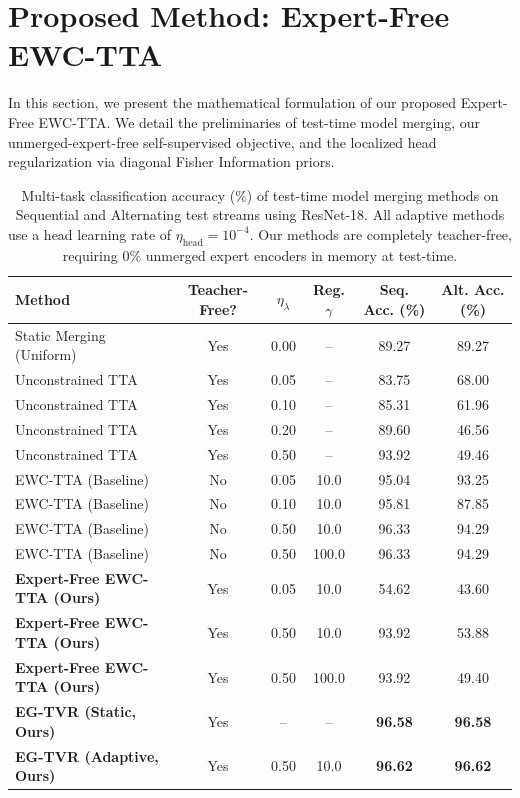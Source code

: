 \documentclass{article}
\theoremstyle{plain}
\theoremstyle{definition}
\theoremstyle{remark}
\begin{document}
\section{Proposed Method: Expert-Free EWC-TTA}
\label{sec:method}

In this section, we present the mathematical formulation of our proposed Expert-Free EWC-TTA. We detail the preliminaries of test-time model merging, our unmerged-expert-free self-supervised objective, and the localized head regularization via diagonal Fisher Information priors.

\begin{table}[t]
\caption{Multi-task classification accuracy (\%) of test-time model merging methods on Sequential and Alternating test streams using ResNet-18. All adaptive methods use a head learning rate of $\eta_{\text{head}}=10^{-4}$. Our methods are completely teacher-free, requiring 0\% unmerged expert encoders in memory at test-time.}
\label{tab:results}
\vskip 0.15in
\begin{center}
\begin{small}
\begin{sc}
\begin{tabular}{lccccc}
\toprule
Method & Teacher-Free? & $\eta_\lambda$ & Reg. $\gamma$ & Seq. Acc. (\%) & Alt. Acc. (\%) \\
\midrule
Static Merging (Uniform) & Yes & 0.00 & -- & 89.27 & 89.27 \\
\midrule
Unconstrained TTA & Yes & 0.05 & -- & 83.75 & 68.00 \\
Unconstrained TTA & Yes & 0.10 & -- & 85.31 & 61.96 \\
Unconstrained TTA & Yes & 0.20 & -- & 89.60 & 46.56 \\
Unconstrained TTA & Yes & 0.50 & -- & 93.92 & 49.46 \\
\midrule
EWC-TTA (Baseline) & No & 0.05 & 10.0 & 95.04 & 93.25 \\
EWC-TTA (Baseline) & No & 0.10 & 10.0 & 95.81 & 87.85 \\
EWC-TTA (Baseline) & No & 0.50 & 10.0 & 96.33 & 94.29 \\
EWC-TTA (Baseline) & No & 0.50 & 100.0 & 96.33 & 94.29 \\
\midrule
\textbf{Expert-Free EWC-TTA (Ours)} & Yes & 0.05 & 10.0 & 54.62 & 43.60 \\
\textbf{Expert-Free EWC-TTA (Ours)} & Yes & 0.50 & 10.0 & 93.92 & 53.88 \\
\textbf{Expert-Free EWC-TTA (Ours)} & Yes & 0.50 & 100.0 & 93.92 & 49.40 \\
\midrule
\textbf{EG-TVR (Static, Ours)} & Yes & -- & -- & \textbf{96.58} & \textbf{96.58} \\
\textbf{EG-TVR (Adaptive, Ours)} & Yes & 0.50 & 10.0 & \textbf{96.62} & \textbf{96.62} \\
\bottomrule
\end{tabular}
\end{sc}
\end{small}
\end{center}
\vskip -0.1in
\end{table}
\end{document}
